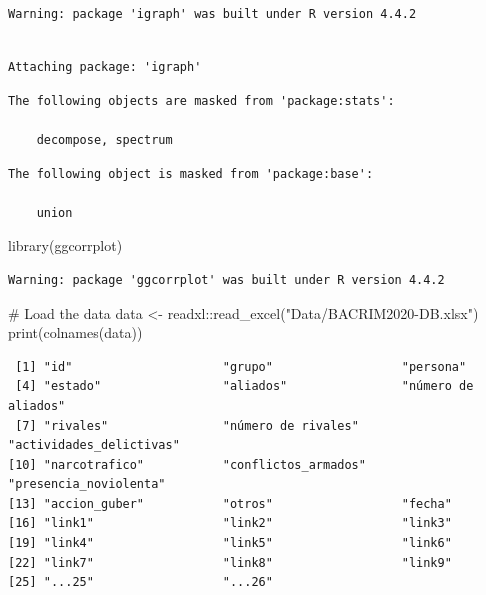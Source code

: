\documentclass[
]{article}
\newenvironment{Shaded}{\begin{snugshade}}{\end{snugshade}}
\newcommand{\CommentTok}[1]{\textcolor[rgb]{0.37,0.37,0.37}{#1}}
\newcommand{\FunctionTok}[1]{\textcolor[rgb]{0.28,0.35,0.67}{#1}}
\newcommand{\NormalTok}[1]{\textcolor[rgb]{0.00,0.23,0.31}{#1}}
\newcommand{\OtherTok}[1]{\textcolor[rgb]{0.00,0.23,0.31}{#1}}
\newcommand{\SpecialCharTok}[1]{\textcolor[rgb]{0.37,0.37,0.37}{#1}}
\newcommand{\StringTok}[1]{\textcolor[rgb]{0.13,0.47,0.30}{#1}}
\begin{document}
\begin{verbatim}
Warning: package 'igraph' was built under R version 4.4.2
\end{verbatim}

\begin{verbatim}

Attaching package: 'igraph'
\end{verbatim}

\begin{verbatim}
The following objects are masked from 'package:stats':

    decompose, spectrum
\end{verbatim}

\begin{verbatim}
The following object is masked from 'package:base':

    union
\end{verbatim}

\begin{Shaded}
\begin{Highlighting}[]
\FunctionTok{library}\NormalTok{(ggcorrplot)}
\end{Highlighting}
\end{Shaded}

\begin{verbatim}
Warning: package 'ggcorrplot' was built under R version 4.4.2
\end{verbatim}

\begin{Shaded}
\begin{Highlighting}[]
\CommentTok{\# Load the data}
\NormalTok{data }\OtherTok{\textless{}{-}}\NormalTok{ readxl}\SpecialCharTok{::}\FunctionTok{read\_excel}\NormalTok{(}\StringTok{"Data/BACRIM2020{-}DB.xlsx"}\NormalTok{)}
\FunctionTok{print}\NormalTok{(}\FunctionTok{colnames}\NormalTok{(data))}
\end{Highlighting}
\end{Shaded}

\begin{verbatim}
 [1] "id"                     "grupo"                  "persona"               
 [4] "estado"                 "aliados"                "número de aliados"     
 [7] "rivales"                "número de rivales"      "actividades_delictivas"
[10] "narcotrafico"           "conflictos_armados"     "presencia_noviolenta"  
[13] "accion_guber"           "otros"                  "fecha"                 
[16] "link1"                  "link2"                  "link3"                 
[19] "link4"                  "link5"                  "link6"                 
[22] "link7"                  "link8"                  "link9"                 
[25] "...25"                  "...26"                 
\end{verbatim}
\end{document}

